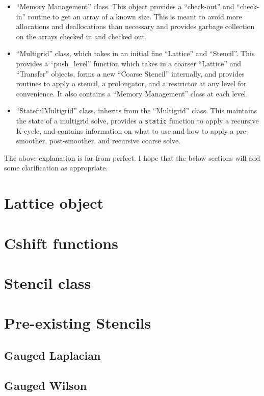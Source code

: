 \documentclass[pdftex,letterpaper,10pt]{article}
\begin{document}
\begin{itemize}
\item ``Memory Management'' class. This object provides a ``check-out'' and ``check-in'' routine to get an array of a known size. This is meant to avoid more allocations and deallocations than necessary and provides garbage collection on the arrays checked in and checked out.
\item ``Multigrid'' class, which takes in an initial fine ``Lattice'' and ``Stencil''. This provides a ``push\_level'' function which takes in a coarser ``Lattice'' and ``Transfer'' objects, forms a new ``Coarse Stencil'' internally, and provides routines to apply a stencil, a prolongator, and a restrictor at any level for convenience. It also contains a ``Memory Management'' class at each level.
\item ``StatefulMultigrid'' class, inherits from the ``Multigrid'' class. This maintains the state of a multigrid solve, provides a {\texttt{static}} function to apply a recursive K-cycle, and contains information on what to use and how to apply a pre-smoother, post-smoother, and recursive coarse solve. 
\end{itemize}

The above explanation is far from perfect. I hope that the below sections will add some clarification as appropriate.

\section{Lattice object}

\section{Cshift functions}

\section{Stencil class}

\section{Pre-existing Stencils}

\subsection{Gauged Laplacian}

\subsection{Gauged Wilson}
\end{document}
